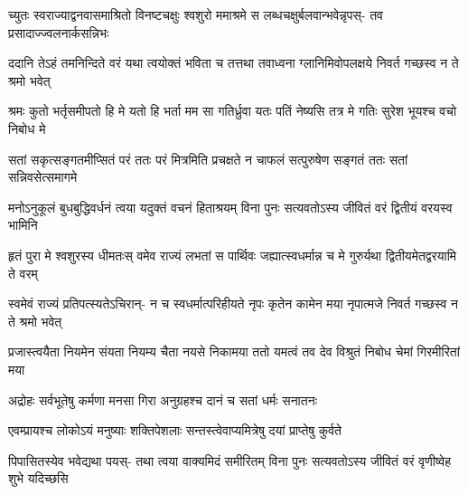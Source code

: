 \begin{center}
\fourlineindentedshloka
{च्युतः स्वराज्याद्वनवासमाश्रितो}
{विनष्टचक्षुः श्वशुरो ममाश्रमे}
{स लब्धचक्षुर्बलवान्भवेन्नृपस्-}
{तव प्रसादाज्ज्वलनार्कसन्निभः}




\fourlineindentedshloka
{ददानि तेऽहं तमनिन्दिते वरं}
{यथा त्वयोक्तं भविता च तत्तथा}
{तवाध्वना ग्लानिमिवोपलक्षये}
{निवर्त गच्छस्व न ते श्रमो भवेत्}




\fourlineindentedshloka
{श्रमः कुतो भर्तृसमीपतो हि मे}
{यतो हि भर्ता मम सा गतिर्ध्रुवा}
{यतः पतिं नेष्यसि तत्र मे गतिः}
{सुरेश भूयश्च वचो निबोध मे}


\fourlineindentedshloka
{सतां सकृत्सङ्गतमीप्सितं परं}
{ततः परं मित्रमिति प्रचक्षते}
{न चाफलं सत्पुरुषेण सङ्गतं}
{ततः सतां सन्निवसेत्समागमे}




\fourlineindentedshloka
{मनोऽनुकूलं बुधबुद्धिवर्धनं}
{त्वया यदुक्तं वचनं हिताश्रयम्}
{विना पुनः सत्यवतोऽस्य जीवितं}
{वरं द्वितीयं वरयस्व भामिनि}




\fourlineindentedshloka
{हृतं पुरा मे श्वशुरस्य धीमतःस्}
{वमेव राज्यं लभतां स पार्थिवः}
{जह्यात्स्वधर्मान्न च मे गुरुर्यथा}
{द्वितीयमेतद्वरयामि ते वरम्}




\fourlineindentedshloka
{स्वमेवं राज्यं प्रतिपत्स्यतेऽचिरान्-}
{न च स्वधर्मात्परिहीयते नृपः}
{कृतेन कामेन मया नृपात्मजे}
{निवर्त गच्छस्व न ते श्रमो भवेत्}




\fourlineindentedshloka
{प्रजास्त्वयैता नियमेन संयता}
{नियम्य चैता नयसे निकामया}
{ततो यमत्वं तव देव विश्रुतं}
{निबोध चेमां गिरमीरितां मया}


\twolineshloka
{अद्रोहः सर्वभूतेषु कर्मणा मनसा गिरा}
{अनुग्रहश्च दानं च सतां धर्मः सनातनः}


\twolineshloka
{एवम्प्रायश्च लोकोऽयं मनुष्याः शक्तिपेशलाः}
{सन्तस्त्वेवाप्यमित्रेषु दयां प्राप्तेषु कुर्वते}




\fourlineindentedshloka
{पिपासितस्येव भवेद्यथा पयस्-}
{तथा त्वया वाक्यमिदं समीरितम्}
{विना पुनः सत्यवतोऽस्य जीवितं}
{वरं वृणीष्वेह शुभे यदिच्छसि}


\end{center}
